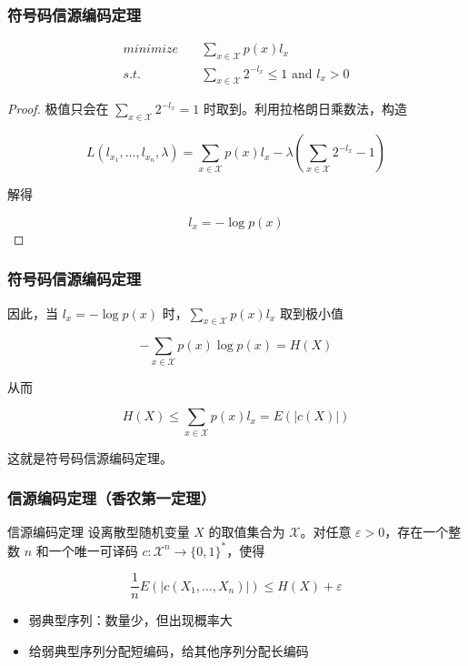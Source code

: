 \documentclass{beamer}
\begin{document}
\begin{frame}
    \frametitle{符号码信源编码定理}

        \[\begin{split}
            minimize & \quad \sum_{x\in\mathcal{X}}p(x)l_x \\
            s.t. & \quad \sum_{x\in\mathcal{X}} 2^{-l_x} \leq 1 \text{ and } l_x > 0
        \end{split}\]

    \begin{proof}
        极值只会在 $\sum_{x\in\mathcal{X}} 2^{-l_x} = 1$ 时取到。利用拉格朗日乘数法，构造

        \[L(l_{x_1}, \dots, l_{x_n}, \lambda) = \sum_{x\in\mathcal{X}} p(x)l_x - \lambda\left(\sum_{x\in\mathcal{X}}2^{-l_x}-1\right)\]
        
        解得

        \[l_x = -\log p(x)\]

    \end{proof}

\end{frame}

\begin{frame}
    \frametitle{符号码信源编码定理}
    
    因此，当 $l_x = -\log p(x)$ 时，$\sum_{x\in\mathcal{X}}p(x)l_x$ 取到极小值

    \[-\sum_{x\in\mathcal{X}}p(x)\log p(x) = H(X)\]

    从而

    \[H(X) \leq \sum_{x\in\mathcal{X}}p(x)l_x = E(\lvert c(X)\rvert)\]

    这就是符号码信源编码定理。

\end{frame}

\begin{frame}
    \frametitle{信源编码定理（香农第一定理）}

    \begin{block}{信源编码定理}
        设离散型随机变量 $X$ 的取值集合为 $\mathcal{X}$。对任意 $\varepsilon > 0$，存在一个整数 $n$ 和一个唯一可译码 $c: \mathcal{X}^n \rightarrow \{0, 1\}^*$，使得

        \[\frac{1}{n}E(\lvert c(X_1, \dots, X_n)\rvert) \leq H(X) + \varepsilon\]
    \end{block}

    \begin{itemize}
        \item 弱典型序列：数量少，但出现概率大
        \item 给弱典型序列分配短编码，给其他序列分配长编码
    \end{itemize}

\end{frame}
\end{document}
